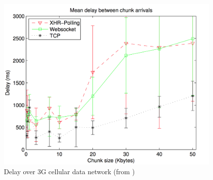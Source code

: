 \documentclass[journal,compsoc]{IEEEtran}
\begin{document}
\begin{figure}[!ht]
    \centering
    \includegraphics[width=\linewidth]{road.png}
    \caption{Delay over 3G cellular data network (from \cite{roadblock})}
    \label{fig:road}
\end{figure}
\end{document}

